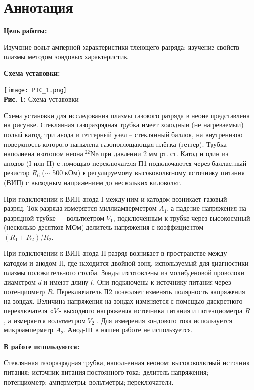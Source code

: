 \documentclass[12pt,a4paper]{scrartcl}
\begin{document}
	\section{Аннотация}
	
	\textbf{Цель работы: }
	
	Изучение вольт-амперной характеристики тлеющего разряда; изучение свойств плазмы методом зондовых характеристик.	
	
	\textbf{Схема установки:}
	\begin{center}
		\texttt{[image: PIC\_1.png]}
		\\\textbf{Рис. 1:} Схема установки
	\end{center}
	
		Схема установки для исследования плазмы газового разряда в неоне представлена на рисунке. Стеклянная газоразрядная трубка имеет холод­ный (не нагреваемый) полый катод, три анода и геттерный узел -- стек­лянный баллон, на внутреннюю поверхность которого напылена газопо­глощающая плёнка (геттер). Трубка наполнена изотопом неона $^{22}\mathrm{Ne}$ при давлении 2 мм рт. ст. Катод и один из анодов (I или II) с помощью переключателя П1 подключаются через балластный резистор $R_{\text{б}}$ ($\sim$ 500 кОм) к регулируемому высоковольтному источнику питания (ВИП) с выходным напряжением до нескольких киловольт.

	При подключении к ВИП анода-I между ним и катодом возникает газовый разряд. Ток разряда измеряется миллиамперметром $A_1$, а паде­ние напряжения на разрядной трубке — вольтметром $V_1$, подключённым к трубке через высокоомный (несколько десятков МОм) делитель напряжения с коэффициентом $(R_1 + R_2) / R_2$.
	
	При подключении к ВИП анода-II разряд возникает в пространстве между катодом и анодом-II, где находится двойной зонд, используемый для диагностики плазмы положительного столба. Зонды изготовлены из молибденовой проволоки диаметром $d$ и имеют длину $l$. Они подклю­чены к источнику питания через потенциометр $R$. Переключатель П2 позволяет изменять полярность напряжения на зондах. Величина на­пряжения на зондах изменяется с помощью дискретного переключателя «$V$» выходного напряжения источника питания и потенциометра $R$, а измеряется вольтметром $V_2$ . Для измерения зондового тока используется микроамперметр $A_2$. Анод-III в нашей работе не используется.

	\textbf{В работе используются:}
	
	Стеклянная газоразрядная трубка, наполнен­ная неоном; высоковольтный источник питания; источник питания посто­янного тока; делитель напряжения; потенциометр; амперметры; вольтмет­ры; переключатели.
\end{document}
